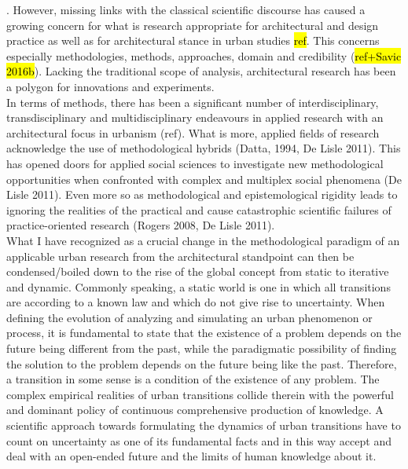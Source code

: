 \documentclass[11pt]{report}
\begin{document}
. However, missing links with the classical scientific discourse has caused a growing concern for what is research appropriate for architectural and design practice as well as for architectural stance in urban studies \hl{ref}. This concerns especially methodologies, methods, approaches, domain and credibility (\hl{ref+Savic 2016b}). Lacking the traditional scope of analysis, architectural research has been a polygon for innovations and experiments.
\\
In terms of methods, there has been a significant number of interdisciplinary, transdisciplinary and multidisciplinary endeavours in applied research with an architectural focus in urbanism (ref). What is more, applied fields of research acknowledge the use of methodological hybrids (Datta, 1994, De Lisle 2011). This has opened doors for applied social sciences to investigate new methodological opportunities when confronted with complex and multiplex social phenomena (De Lisle 2011). Even more so as methodological and epistemological rigidity leads to ignoring the realities of the practical and cause catastrophic scientific failures of practice-oriented research (Rogers 2008, De Lisle 2011).
\\
What I have recognized as a crucial change in the methodological paradigm of an applicable urban research from the architectural standpoint can then be condensed/boiled down to the rise of the global concept from static to iterative and dynamic. Commonly speaking, a static world is one in which all transitions are according to a known law and which do not give rise to uncertainty. When defining the evolution of analyzing and simulating an urban phenomenon or process, it is fundamental to state that the existence of a problem depends on the future being different from the past, while the paradigmatic possibility of finding the solution to the problem depends on the future being like the past. Therefore, a transition in some sense is a condition of the existence of any problem. The complex empirical realities of urban transitions collide therein with the powerful and dominant policy of continuous comprehensive production of knowledge. A scientific approach towards formulating the dynamics of urban transitions have to count on uncertainty as one of its fundamental facts and in this way accept and deal with an open-ended future and the limits of human knowledge about it.
\end{document}
